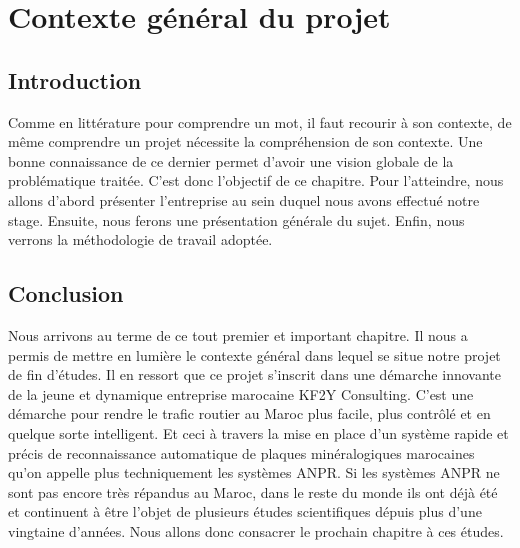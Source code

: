 \chapter{\textbf{Contexte général du projet}}

\section{Introduction}

Comme en littérature pour comprendre un mot, il faut recourir à son contexte, de même comprendre un projet nécessite la compréhension de son contexte. Une bonne connaissance de ce dernier permet d’avoir une vision globale de la problématique traitée. C’est donc l’objectif de ce chapitre. Pour l’atteindre, nous allons d’abord présenter l’entreprise au sein duquel nous avons effectué notre stage. Ensuite, nous ferons une présentation générale du sujet. Enfin, nous verrons la méthodologie de travail adoptée.





\section{Conclusion}
Nous arrivons au terme de ce tout premier et important chapitre. Il nous a permis de mettre en lumière le contexte général dans lequel se situe notre projet de fin d’études. Il en ressort que ce projet s’inscrit dans une démarche innovante de la jeune et dynamique entreprise marocaine KF2Y Consulting. C’est une démarche pour rendre le trafic routier au Maroc plus facile, plus contrôlé et en quelque sorte intelligent. Et ceci à travers la mise en place d’un système rapide et précis de reconnaissance automatique de plaques minéralogiques marocaines qu'on appelle plus techniquement les systèmes ANPR. Si les systèmes ANPR ne sont pas encore très répandus au Maroc, dans le reste du monde ils ont déjà été et continuent à être l'objet de plusieurs études scientifiques dépuis plus d’une vingtaine d’années. Nous allons donc consacrer le prochain chapitre à ces études.